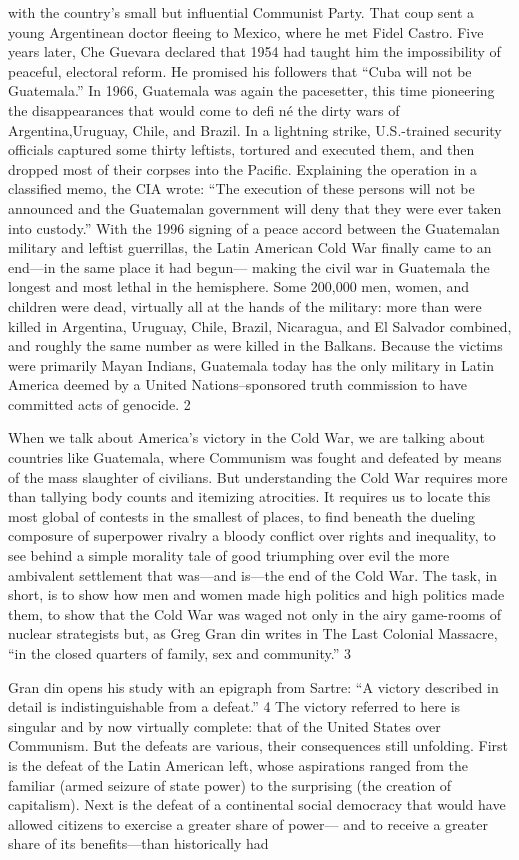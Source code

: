 with the country’s small but influential Communist Party. That coup sent a young Argentinean doctor fleeing to Mexico, where he met Fidel Castro. Five years later, Che Guevara declared that 1954 had taught him the impossibility of peaceful, electoral reform. He promised his followers that “Cuba will not be Guatemala.” In 1966, Guatemala was again the pacesetter, this time pioneering the disappearances that would come to defi né the dirty wars of Argentina,Uruguay, Chile, and Brazil. In a lightning strike, U.S.-trained security officials captured some thirty leftists, tortured and executed them, and then dropped most of their corpses into the Pacific. Explaining the operation in a classified memo, the CIA wrote: “The execution of these persons will not be announced and the Guatemalan government will deny that they were ever taken into custody.” With the 1996 signing of a peace accord between the Guatemalan military and leftist guerrillas, the Latin American Cold War finally came to an end—in the same place it had begun— making the civil war in Guatemala the longest and most lethal in the hemisphere. Some 200,000 men, women, and children were dead, virtually all at the hands of the military: more than were killed in Argentina, Uruguay, Chile, Brazil, Nicaragua, and El Salvador combined, and roughly the same number as were killed in the Balkans. Because the victims were primarily Mayan Indians, Guatemala today has the only military in Latin America deemed by a United Nations–sponsored truth commission to have committed acts of genocide. {\color{blue} 2 } {\par} When we talk about America’s victory in the Cold War, we are talking about countries like Guatemala, where Communism was fought and defeated by means of the mass slaughter of civilians. But understanding the Cold War requires more than tallying body counts and itemizing atrocities. It requires us to locate this most global of contests in the smallest of places, to find beneath the dueling composure of superpower rivalry a bloody conflict over rights and inequality, to see behind a simple morality tale of good triumphing over evil the more ambivalent settlement that was—and is—the end of the Cold War. The task, in short, is to show how men and women made high politics and high politics made them, to show that the Cold War was waged not only in the airy game-rooms of nuclear strategists but, as Greg Gran din writes in The Last Colonial Massacre, “in the closed quarters of family, sex and community.” {\color{blue} 3 } {\par} Gran din opens his study with an epigraph from Sartre: “A victory described in detail is indistinguishable from a defeat.” {\color{blue} 4 } The victory referred to here is singular and by now virtually complete: that of the United States over Communism. But the defeats are various, their consequences still unfolding. First is the defeat of the Latin American left, whose aspirations ranged from the familiar (armed seizure of state power) to the surprising (the creation of capitalism). Next is the defeat of a continental social democracy that would have allowed citizens to exercise a greater share of power— and to receive a greater share of its benefits—than historically had 
